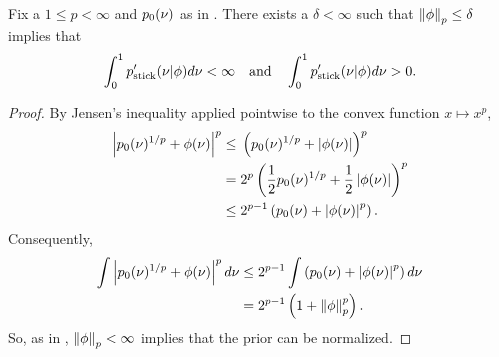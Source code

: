 \begin{lem}
%
Fix a $1 \le p < \infty$ and $p_{0}(\nu)$ as in .
There exists a $\delta < \infty$ such that $\left\Vert\phi\right\Vert_p \le \delta$
implies that
%
\begin{align*}
%
\int_0^1 \pstick'(\nu \vert \phi) d\nu < \infty
\mathtxt{and}
\int_0^1 \pstick'(\nu \vert \phi) d\nu > 0.
%
\end{align*}
%
\begin{proof}
%
By Jensen's inequality applied pointwise to the convex function $x \mapsto
x^p$,
%
\begin{align*}
%
\abs{\pbase(\nu)^{1/p} + \phi(\nu) }^{p} \le{}&
    \left(\pbase(\nu)^{1/p} + \abs{\phi(\nu)} \right)^{p}
\\={}&
    2^p \left(\frac{1}{2}\pbase(\nu)^{1/p} +
              \frac{1}{2} \abs{\phi(\nu)} \right)^{p}
\\\le{}&
    2^{p-1} \left(\pbase(\nu) + \abs{\phi(\nu)}^p \right).
%
\end{align*}
%
Consequently,
%
\begin{align*}
%
\int \abs{\pbase(\nu)^{1/p} + \phi(\nu) }^{p} d\nu \le{}&
    2^{p-1} \int \left(\pbase(\nu) + \abs{\phi(\nu)}^p \right) d\nu
\\={}&
    2^{p-1} \left(1 + \norm{\phi}_p^p\right).
%
\end{align*}
%
So, as in \citep[Result 2]{gustafson:1996:local}, $\left\Vert\phi\right\Vert_p < \infty$
implies that the prior can be normalized.


\end{proof}
\end{lem}

